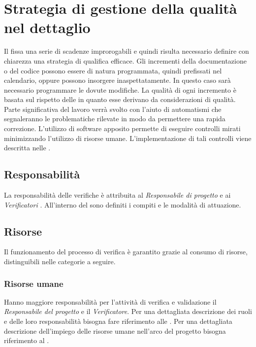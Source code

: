 \section[Visione di dettaglio della qualità]{Strategia di gestione
  della qualità nel dettaglio}

Il \pianodiprogetto  fissa una serie di scadenze improrogabili e quindi risulta necessario definire
con chiarezza una strategia di qualifica efficace. Gli incrementi della documentazione o del codice
possono essere di natura programmata, quindi prefissati nel calendario, oppure possono insorgere
inaspettatamente. In questo caso sarà necessario programmare le dovute
modifiche.
La qualità di ogni incremento è basata sul rispetto delle \normediprogetto in quanto esse derivano da considerazioni di qualità.
Parte significativa del lavoro
verrà svolto con l'aiuto di automatismi che segnaleranno le problematiche rilevate in modo da
permettere una rapida correzione. L’utilizzo di software apposito permette di eseguire controlli
mirati minimizzando l'utilizzo di risorse umane. L'implementazione di tali controlli viene descritta nelle
\normediprogetto .



\subsection{Responsabilità}

La responsabilità delle verifiche è attribuita al  \emph{Responsabile di
  progetto} e ai  \emph{Verificatori} . All'interno del \pianodiprogetto  sono definiti i compiti e le modalità di
attuazione.

\subsection{Risorse}
Il funzionamento del processo di verifica è garantito grazie al consumo di risorse, distinguibili
nelle categorie a seguire.
\subsubsection{Risorse umane}

Hanno maggiore responsabilità per l'attività di verifica
e validazione il \emph{Responsabile del progetto} e il
\emph{Verificatore}. Per una dettagliata descrizione dei ruoli e delle
loro responsabilità bisogna fare riferimento alle \normediprogetto. Per una dettagliata descrizione dell'impiego delle
risorse umane nell'arco del progetto bisogna riferimento al \pianodiprogetto.

